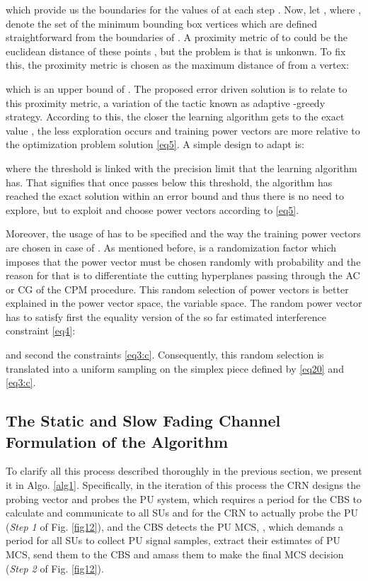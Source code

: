 \documentclass[journal]{IEEEtran}
\begin{document}
which provide us the boundaries for the values of  at each step . Now, let , where , denote the set of the minimum bounding box vertices which are defined straightforward from the boundaries of . A proximity metric of  to  could be the euclidean distance of these points , but the problem is that  is unkonwn. To fix this, the proximity metric is chosen as the maximum distance of  from a  vertex:


which is an upper bound of . The proposed error driven solution is to relate  to this proximity metric, a variation of the tactic known as adaptive -greedy strategy. According to this, the closer the learning algorithm gets to the exact value , the less exploration occurs and training power vectors are more relative to the optimization problem solution \eqref{eq5}. A simple design to adapt  is:


where the threshold  is linked with the precision limit that the learning algorithm has. That signifies that once  passes below this threshold, the algorithm has reached the exact solution within an error bound and thus there is no need to explore, but to exploit and choose power vectors according to \eqref{eq5}.

Moreover, the usage of  has to be specified and the way the training power vectors are chosen in case of . As mentioned before,  is a randomization factor which imposes that the power vector must be chosen randomly with  probability and the reason for that is to differentiate the cutting hyperplanes passing through the AC or CG of the CPM procedure. This random selection of power vectors is better explained in the power vector space, the variable space. The random power vector has to satisfy first the equality version of the so far estimated interference constraint \eqref{eq4}:


and second the constraints \eqref{eq3:c}. Consequently, this random selection is translated into a uniform sampling on the simplex piece  defined by \eqref{eq20} and \eqref{eq3:c}.

\subsection{The Static and Slow Fading Channel Formulation of the Algorithm}

To clarify all this process described thoroughly in the previous section, we present it in Algo. \ref{alg1}. Specifically, in the  iteration of this process the CRN designs the probing vector  and probes the PU system, which requires a  period for the CBS to calculate and communicate  to all SUs and for the CRN to actually probe the PU (\textit{Step 1} of Fig. \ref{fig12}), and the CBS detects the PU MCS, , which demands a  period for all SUs to collect PU signal samples, extract their estimates of PU MCS, send them to the CBS and amass them to make the final MCS decision (\textit{Step 2} of Fig. \ref{fig12}).
\end{document}

